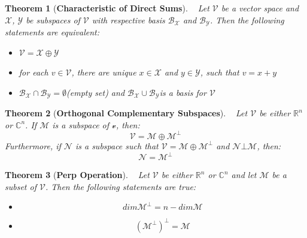 \documentclass[]{article}
\newtheorem{theo}{Theorem}
\newenvironment{definition}[2][Definition]{\begin{trivlist}
\item[\hskip \labelsep {\bfseries #1}\hskip \labelsep {\bfseries #2.}]}{\end{trivlist}}
\begin{document}
\begin{theo}[\textbf{Characteristic of Direct Sums}]
~ Let $\mathcal{V}$ be a vector space and $\mathcal{X}$, $\mathcal{Y}$ be subspaces of $\mathcal{V}$ with respective basis $\mathcal{B}_{\mathcal{X}}$ and $\mathcal{B}_{\mathcal{Y}}$. Then the following statements are equivalent:
\begin{itemize}
\item $\mathcal{V}=\mathcal{X}\oplus \mathcal{Y}$
\item \textit{for each $v\in \mathcal{V}$, there are unique $x\in \mathcal{X}$ and $y\in \mathcal{Y}$, such that $v=x+y$}
\item \textit{$\mathcal{B}_{\mathcal{X}}\cap \mathcal{B}_{\mathcal{Y}}=\emptyset$(empty set) and $\mathcal{B}_{\mathcal{X}}\cup \mathcal{B}_{\mathcal{Y}}$is a basis for $\mathcal{V}$}
\end{itemize}
\end{theo}


\begin{theo}[\textbf{Orthogonal Complementary Subspaces}]
~ Let $\mathcal{V}$ be either $\mathbb{R}^n$ or $\mathbb{C}^n$. If $\mathcal{M}$ is a subspace of $\mathcal{v}$, then:
$$\mathcal{V}=\mathcal{M}\oplus \mathcal{M}^{\bot}$$
Furthermore, if $\mathcal{N}$ is a subspace such that $\mathcal{V}=\mathcal{M}\oplus \mathcal{M}^{\bot}$ and $\mathcal{N}\bot \mathcal{M}$, then:
$$\mathcal{N}= \mathcal{M}^{\bot}$$
\end{theo}

\begin{theo}[\textbf{Perp Operation}]
~ Let $\mathcal{V}$ be either $\mathbb{R}^n$ or $\mathbb{C}^n$ and let $\mathcal{M}$ be a subset of $\mathcal{V}$. Then the following statements are true:
\begin{itemize}
\item $$dim\mathcal{M}^{\bot}=n-dim\mathcal{M}$$
\item $$(\mathcal{M}^{\bot})^{\bot}=\mathcal{M}$$
\end{itemize}
\end{theo}
\end{document}
